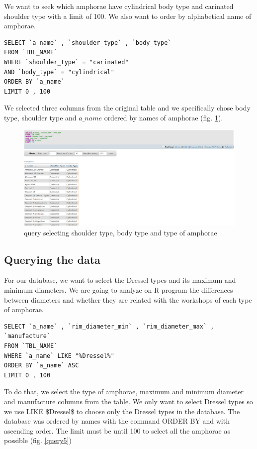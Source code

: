 \documentclass[10pt,a4paper]{article}
\begin{document}
We want to seek which amphorae have cylindrical body type and carinated shoulder type with a limit of 100. We also want to order by alphabetical name of amphorae. 

\begin{verbatim}
SELECT `a_name` , `shoulder_type` , `body_type`
FROM `TBL_NAME`
WHERE `shoulder_type` = "carinated"
AND `body_type` = "cylindrical"
ORDER BY `a_name`
LIMIT 0 , 100
\end{verbatim}

We selected three columns from the original table and we specifically chose body type, shoulder type and $a\_name$ ordered by names of amphorae (fig. \ref{query4}).

\begin{figure}[htp]
\centering
\includegraphics[scale=0.30]{query4.png}
\caption{query selecting shoulder type, body type and type of amphorae}
\label{query4}
\end{figure} 


\subsection{Querying the data}

For our database, we want to select the Dressel types and its maximum and minimum diameters. We are going to analyze on R program the differences between diameters and whether they are related with the workshops of each type of amphorae. 

\begin{verbatim}
SELECT `a_name` , `rim_diameter_min` , `rim_diameter_max` , `manufacture`
FROM `TBL_NAME`
WHERE `a_name` LIKE "%Dressel%"
ORDER BY `a_name` ASC
LIMIT 0 , 100
\end{verbatim}

To do that, we select the type of amphorae, maximum and minimum diameter and manufacture columns from the table. We only want to select Dressel types so we use LIKE \$Dressel\$ to choose only the Dressel types in the database. The database was ordered by names with the command ORDER BY and with ascending order. The limit must be until 100 to select all the amphorae as possible (fig. \ref{query5})
\end{document}

